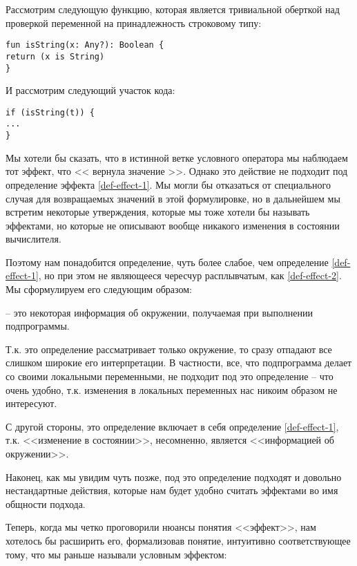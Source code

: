 Рассмотрим следующую функцию, которая является тривиальной оберткой над проверкой переменной на принадлежность строковому типу:

\begin{verbatim}
fun isString(x: Any?): Boolean {
return (x is String)
}
\end{verbatim}

И рассмотрим следующий участок кода:

\begin{verbatim}
if (isString(t)) {
...
}
\end{verbatim}

Мы хотели бы сказать, что в истинной ветке условного оператора мы наблюдаем тот эффект, что << вернула значение >>. Однако это действие не подходит под определение эффекта \ref{def-effect-1}. Мы могли бы отказаться от специального случая для возвращаемых значений в этой формулировке, но в дальнейшем мы встретим некоторые утверждения, которые мы тоже хотели бы называть эффектами, но которые не описывают вообще никакого изменения в состоянии вычислителя.

Поэтому нам понадобится определение, чуть более слабое, чем определение \ref{def-effect-1}, но при этом не являющееся чересчур расплывчатым, как \ref{def-effect-2}. Мы сформулируем его следующим образом:

\begin{definition}
    \label{def-effect}
     -- это некоторая информация об окружении, получаемая при выполнении подпрограммы.
\end{definition}

Т.к. это определение рассматривает только окружение, то сразу отпадают все слишком широкие его интерпретации. В частности, все, что подпрограмма делает со своими локальными переменными, не подходит под это определение -- что очень удобно, т.к. изменения в локальных переменных нас никоим образом не интересуют.

С другой стороны, это определение включает в себя определение \ref{def-effect-1}, т.к. <<изменение в состоянии>>, несомненно, является <<информацией об окружении>>.

Наконец, как мы увидим чуть позже, под это определение подходят и довольно нестандартные действия, которые нам будет удобно считать эффектами во имя общности подхода.

\bigskip

Теперь, когда мы четко проговорили нюансы понятия <<эффект>>, нам хотелось бы расширить его, формализовав понятие, интуитивно соответствующее тому, что мы раньше называли условным эффектом:

